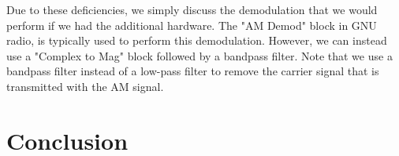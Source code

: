 \documentclass{article}
\begin{document}
Due to these deficiencies, we simply discuss the demodulation that we would perform if we had the additional hardware. The "AM Demod" block in GNU radio, is typically used to perform this demodulation. However, we can instead use a "Complex to Mag" block followed by a bandpass filter. Note that we use a bandpass filter instead of a low-pass filter to remove the carrier signal that is transmitted with the AM signal.
  
\section{Conclusion}

%
%
	
\end{document}
